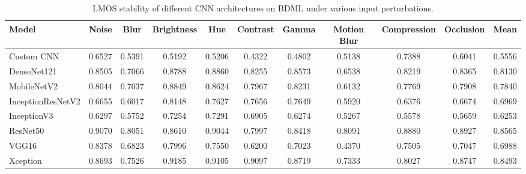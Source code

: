 \documentclass[a4paper,fleqn]{cas-dc}
\begin{document}
\begin{table}[t]
\centering
\caption{LMOS stability of different CNN architectures on BDML under various input perturbations.}
\label{tab:lmos_stability_bdmedileaves}

\scriptsize
\setlength{\tabcolsep}{3pt}
\renewcommand{\arraystretch}{1.1}

\begin{tabular}{|l|ccccccccc|c|}
\hline
\textbf{Model} &
\textbf{Noise} &
\textbf{Blur} &
\textbf{Brightness} &
\textbf{Hue} &
\textbf{Contrast} &
\textbf{Gamma} &
\textbf{Motion Blur} &
\textbf{Compression} &
\textbf{Occlusion} &
\textbf{Mean} \\
\hline

Custom CNN
&0.6527&0.5391&0.5192&0.5206&0.4322&0.4802&0.5138&0.7388&0.6041&0.5556\\

DenseNet121
&0.8505&0.7066&0.8788&0.8860&0.8255&0.8573&0.6538&0.8219&0.8365&0.8130\\

MobileNetV2
&0.8044&0.7037&0.8849&0.8624&0.7967&0.8231&0.6132&0.7769&0.7908&0.7840\\

InceptionResNetV2
&0.6655&0.6017&0.8148&0.7627&0.7656&0.7649&0.5920&0.6376&0.6674&0.6969\\

InceptionV3
&0.6297&0.5752&0.7254&0.7291&0.6905&0.6274&0.5267&0.5578&0.5659&0.6253\\

ResNet50
&0.9070&0.8051&0.8610&0.9044&0.7997&0.8418&0.8091&0.8880&0.8927&0.8565\\

VGG16
&0.8378&0.6823&0.7996&0.7550&0.6200&0.7023&0.4370&0.7505&0.7047&0.6988\\

Xception
&0.8693&0.7526&0.9185&0.9105&0.9097&0.8719&0.7333&0.8027&0.8747&0.8493\\

\hline
\end{tabular}
\end{table}
\end{document}

